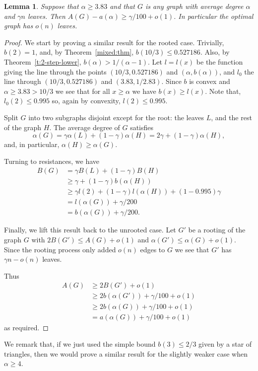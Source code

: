 \documentclass[11pt]{article}
\newtheorem{lemma}[theorem]{Lemma}
\theoremstyle{remark}
\def\a{\alpha}
\begin{document}
\begin{lemma}\label{l:no-leaves}
  Suppose that $\a\ge 3.83$ and that $G$ is any graph with average degree
  $\a$ and $\gamma n$ leaves. Then $A(G)-a(\a)\ge\gamma/100+o(1)$. In
  particular the optimal graph has $o(n)$ leaves.
\end{lemma}
\begin{proof}
  We start by proving a similar result for the rooted case.
  Trivially, $b(2)=1$, and, by Theorem~\ref{mixed:thm}, $b(10/3)\le
  0.527186$. Also, by Theorem~\ref{t:2-step-lower},
  $b(\a)>1/(\a-1)$. Let $l=l(x)$ be the function giving the line
  through the points $(10/3,0.527186)$ and $(\a,b(\a))$, and $l_0$ the
  line through $(10/3,0.527186)$ and $(3.83,1/2.83)$.  Since $b$
  is convex and $\a\ge 3.83>10/3$ we see that for all $x\ge \a$ we have
  $b(x)\ge l(x)$. Note that, $l_0(2)\le 0.995$ so, again by
  convexity, $l(2)\le 0.995$.

  Split $G$ into two subgraphs disjoint except for the root: the
  leaves $L$, and the rest of the graph $H$. The average degree
  of $G$ satisfies
  \[\a(G)=\gamma\alpha(L)+(1-\gamma)\alpha(H)=2\gamma
  +(1-\gamma)\alpha(H),\] and, in particular, $\a(H)\ge \a(G)$.

  Turning to resistances, we have
  \begin{align*}
    B(G)&=\gamma B(L)+(1-\gamma) B(H)\\
    &\ge \gamma+(1-\gamma)b(\alpha(H))\\
    &\ge \gamma l(2)+(1-\gamma)l(\alpha(H))+(1-0.995)\gamma\\
    &=l(\a(G))+\gamma/200\\
    &=b(\a(G))+\gamma/200.
  \end{align*}
  
  Finally, we lift this result back to the unrooted case. Let $G'$ be
  a rooting of the graph $G$ with $2 B(G')\le A(G)+o(1)$ and
  $\a(G')\le \a(G)+o(1)$. Since the rooting process only added $o(n)$
  edges to $G$ we see that $G'$ has $\gamma n-o(n)$ leaves.

  Thus 
  \begin{align*}
  A(G)&\ge 2 B(G')+o(1)\\
  &\ge 2b(\alpha(G'))+\gamma/100+o(1)\\
  &\ge 2b(\alpha(G))+\gamma/100+o(1)\\
  &=a(\alpha(G))+\gamma/100+o(1)
\end{align*}
as required.
\end{proof}
We remark that, if we just used the simple bound $b(3)\le 2/3$ given
by a star of triangles, then we would prove a similar result for the
slightly weaker case when $\a\ge 4$.
\end{document}
